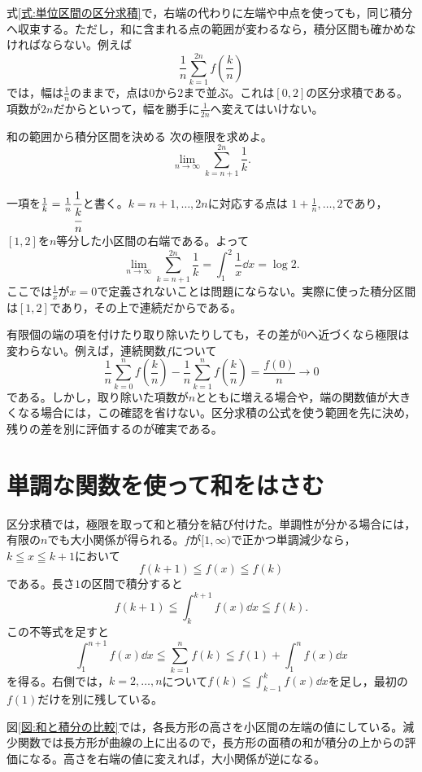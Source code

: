式\eqref{式:単位区間の区分求積}で，右端の代わりに左端や中点を使っても，同じ積分へ収束する。ただし，和に含まれる点の範囲が変わるなら，積分区間も確かめなければならない。例えば
\[
 \frac1n\sum_{k=1}^{2n}f\left(\frac{k}{n}\right)
\]
では，幅は$\frac1n$のままで，点は$0$から$2$まで並ぶ。これは$[0,2]$の区分求積である。項数が$2n$だからといって，幅を勝手に$\frac1{2n}$へ変えてはいけない。

\begin{example}{和の範囲から積分区間を決める}
次の極限を求めよ。
\[
 \lim_{n\to\infty}\sum_{k=n+1}^{2n}\frac1k.
\]
\end{example}

一項を$\frac1k=\frac1n\cfrac1{\cfrac{k}{n}}$と書く。$k=n+1,\ldots,2n$に対応する点は
$1+\frac1n,\ldots,2$であり，$[1,2]$を$n$等分した小区間の右端である。よって
\[
 \lim_{n\to\infty}\sum_{k=n+1}^{2n}\frac1k
 =\int_1^2\frac1x\dd x=\log2.
\]
ここでは$\frac1x$が$x=0$で定義されないことは問題にならない。実際に使った積分区間は$[1,2]$であり，その上で連続だからである。

有限個の端の項を付けたり取り除いたりしても，その差が$0$へ近づくなら極限は変わらない。例えば，連続関数$f$について
\[
 \frac1n\sum_{k=0}^{n}f\left(\frac{k}{n}\right)
 -\frac1n\sum_{k=1}^{n}f\left(\frac{k}{n}\right)
 =\frac{f(0)}n\longrightarrow0
\]
である。しかし，取り除いた項数が$n$とともに増える場合や，端の関数値が大きくなる場合には，この確認を省けない。区分求積の公式を使う範囲を先に決め，残りの差を別に評価するのが確実である。

\section{単調な関数を使って和をはさむ}\label{節:和と積分の比較}

区分求積では，極限を取って和と積分を結び付けた。単調性が分かる場合には，有限の$n$でも大小関係が得られる。$f$が$[1,\infty)$で正かつ単調減少なら，$k\leqq x\leqq k+1$において
\[
 f(k+1)\leqq f(x)\leqq f(k)
\]
である。長さ$1$の区間で積分すると
\[
 f(k+1)\leqq\int_k^{k+1}f(x)\dd x\leqq f(k).
\]
この不等式を足すと
\begin{equation}\label{式:減少関数の和比較}
 \int_1^{n+1}f(x)\dd x
 \leqq\sum_{k=1}^{n}f(k)
 \leqq f(1)+\int_1^{n}f(x)\dd x
\end{equation}
を得る。右側では，$k=2,\ldots,n$について$f(k)\leqq\int_{k-1}^{k}f(x)\dd x$を足し，最初の$f(1)$だけを別に残している。

図\ref{図:和と積分の比較}では，各長方形の高さを小区間の左端の値にしている。減少関数では長方形が曲線の上に出るので，長方形の面積の和が積分の上からの評価になる。高さを右端の値に変えれば，大小関係が逆になる。

